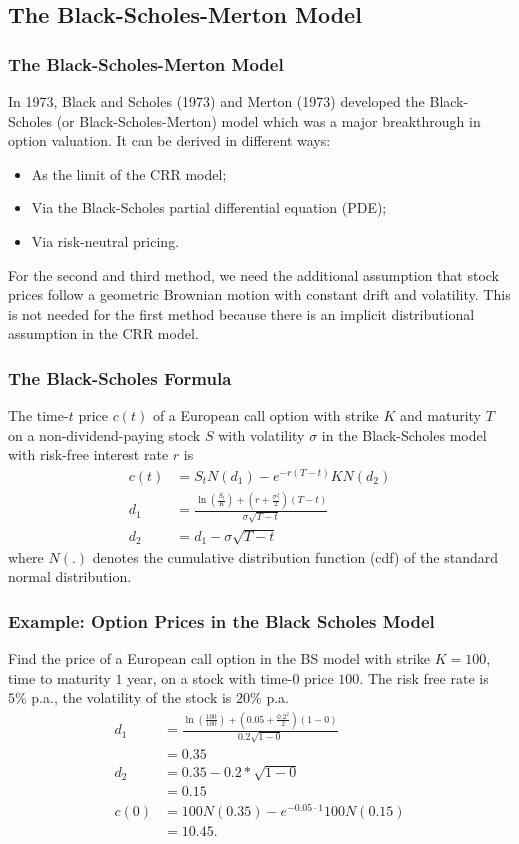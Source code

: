 \subsection{The Black-Scholes-Merton Model}
\begin{frame}[fragile]
\frametitle{The Black-Scholes-Merton Model}
In 1973, Black and Scholes (1973) and Merton (1973)
developed the Black-Scholes (or Black-Scholes-Merton) model which was a major breakthrough in
option valuation. It can be derived in different ways:
\begin{itemize}
  \item As the limit of the CRR model;
  \item Via the Black-Scholes partial differential equation (PDE);
  \item Via risk-neutral pricing.
\end{itemize}
For the second and third method, we need the additional assumption that stock
prices follow a geometric Brownian motion with constant drift and volatility.
This is not needed for the first method because there is an implicit distributional assumption in the CRR model.
\end{frame}

\begin{frame}[fragile]
\frametitle{The Black-Scholes Formula}
The time-$t$ price $c(t)$ of a European call option with strike $K$ and
maturity $T$ on a non-dividend-paying stock $S$ with volatility $\sigma$ in the
Black-Scholes model with risk-free interest rate $r$ is
\begin{align*}
  c(t) &= S_t N(d_1) - e^{-r(T-t)}KN(d_2)\\
  d_1 &= \frac{\ln \left(\frac{S_t}{K} \right) +
  \left(r+\frac{\sigma^2}{2}\right)(T-t)}{\sigma\sqrt{T-t}}\\
  d_2 &= d_1 - \sigma \sqrt{T-t}
\end{align*}
where $N(.)$ denotes the cumulative distribution function (cdf) of the standard
normal distribution.
\end{frame}

\begin{frame}[fragile]
\frametitle{Example: Option Prices in the Black Scholes Model}
Find the price of a European call option in the BS model with strike $K=100$,
time to maturity $1$ year, on a stock with time-$0$ price $100$. The risk free
rate is $5\%$ p.a., the volatility of the stock is $20\%$ p.a.
\begin{align*}
  d_1&=\frac{\ln \left(\frac{100}{100} \right) +
  \left(0.05+\frac{0.2^2}{2}\right)(1-0)}{0.2 \sqrt{1-0}}\\&=0.35\\
  d_2&=0.35-0.2*\sqrt{1-0} \\&= 0.15\\
  c(0)&=100 N(0.35) - e^{-0.05\cdot 1}100N(0.15)\\&=10.45.
\end{align*}

\end{frame}


